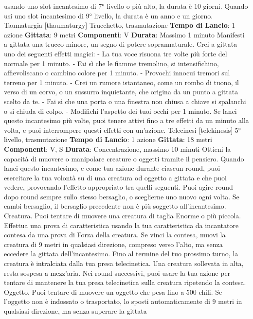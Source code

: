 \begin{multicols}{2}
usando uno slot incantesimo di 7° livello o più alto, la
durata è 10 giorni. Quando usi uno slot incantesimo di
9° livello, la durata è un anno e un giorno.
Taumaturgia
[thaumaturgy]
Trucchetto, trasmutazione
\textbf{Tempo di Lancio}: 1 azione
\textbf{Gittata}: 9 metri
\textbf{Componenti}: V
\textbf{Durata}: Massimo 1 minuto
Manifesti a gittata una trucco minore, un segno di
potere soprannaturale. Crei a gittata uno dei seguenti
effetti magici:
- La tua voce risuona tre volte più forte del normale
per 1 minuto.
- Fai sì che le fiamme tremolino, si intensifichino,
affievoliscano o cambino colore per 1 minuto.
- Provochi innocui tremori sul terreno per 1 minuto.
- Crei un rumore istantaneo, come un rombo di tuono,
il verso di un corvo, o un sussurro inquietante, che
origina da un punto a gittata scelto da te.
- Fai sì che una porta o una finestra non chiusa a
chiave si spalanchi o si chiuda di colpo.
- Modifichi l’aspetto dei tuoi occhi per 1 minuto.
Se lanci questo incantesimo più volte, puoi tenere attivi
fino a tre effetti da un minuto alla volta, e puoi
interrompere questi effetti con un’azione.
Telecinesi
[telekinesis]
5° livello, trasmutazione
\textbf{Tempo di Lancio}: 1 azione
\textbf{Gittata}: 18 metri
\textbf{Componenti}: V, S
\textbf{Durata}: Concentrazione, massimo 10 minuti
Ottieni la capacità di muovere o manipolare creature o
oggetti tramite il pensiero. Quando lanci questo
incantesimo, e come tua azione durante ciascun round,
puoi esercitare la tua volontà su di una creatura od
oggetto a gittata e che puoi vedere, provocando l’effetto
appropriato tra quelli seguenti. Puoi agire round dopo
round sempre sullo stesso bersaglio, o sceglierne uno
nuovo ogni volta. Se cambi bersaglio, il bersaglio
precedente non è più soggetto all’incantesimo.
Creatura. Puoi tentare di muovere una creatura di
taglia Enorme o più piccola. Effettua una prova di
caratteristica usando la tua caratteristica da incantatore
contesa da una prova di Forza della creatura. Se vinci
la contesa, muovi la creatura di 9 metri in qualsiasi
direzione, compreso verso l’alto, ma senza eccedere la
gittata dell’incantesimo. Fino al termine del tuo
prossimo turno, la creatura è intralciata dalla tua presa
telecinetica. Una creatura sollevata in alta, resta
sospesa a mezz’aria.
Nei round successivi, puoi usare la tua azione per
tentare di mantenere la tua presa telecinetica sulla
creatura ripetendo la contesa.
Oggetto. Puoi tentare di muovere un oggetto che pesa
fino a 500 chili. Se l’oggetto non è indossato o
trasportato, lo sposti automaticamente di 9 metri in
qualsiasi direzione, ma senza superare la gittata

\end{multicols}
